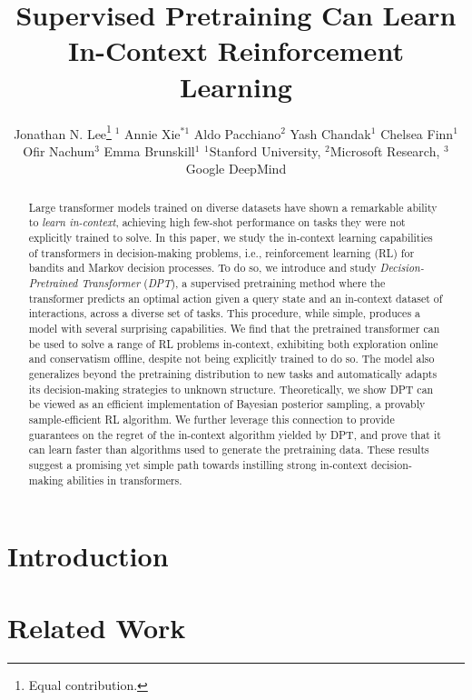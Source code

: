 \documentclass{article}
\title{
Supervised Pretraining Can Learn\\In-Context Reinforcement Learning
}
\author{%
  Jonathan N. Lee\thanks{Equal contribution.}$^{\ \,1}$
  \And
  Annie Xie$^{*1}$%
  \And
  Aldo Pacchiano$^{2}$%
  \And
  Yash Chandak$^{1}$%
  \AND
  Chelsea Finn$^{1}$%
  \And
  Ofir Nachum$^{3}$%
  \And
  Emma Brunskill$^{1}$%
  \AND
  \textnormal{$^{1}$Stanford University, $^{2}$Microsoft Research, 
  $^{3}$Google DeepMind}
}
\begin{document}
\maketitle


\begin{abstract}
Large transformer models trained on diverse datasets have shown a remarkable ability to \emph{learn in-context}, achieving high few-shot performance on tasks they were not explicitly trained to solve. In this paper, we study the in-context learning capabilities of transformers in decision-making problems, i.e., reinforcement learning (RL) for bandits and Markov decision processes. To do so, we introduce and study \emph{Decision-Pretrained Transformer} (\emph{DPT}), a supervised pretraining method where the transformer predicts an optimal action given a query state and an in-context dataset of interactions, across a diverse set of tasks. This procedure, while simple, produces a model with several surprising capabilities. We find that the pretrained transformer can be used to solve a range of RL problems in-context, exhibiting both exploration online and conservatism offline, despite not being explicitly trained to do so. The model also generalizes beyond the pretraining distribution to new tasks and automatically adapts its decision-making strategies to unknown structure. Theoretically, we show DPT can be viewed as an efficient implementation of Bayesian posterior sampling, a provably sample-efficient RL algorithm. We further leverage this connection to provide guarantees on the regret of the in-context algorithm yielded by DPT, and prove that it can learn faster than algorithms used to generate the pretraining data. These results suggest a promising yet simple path towards instilling strong in-context decision-making abilities in transformers.
\end{abstract}



\section{Introduction}


\section{Related Work}
\end{document}

